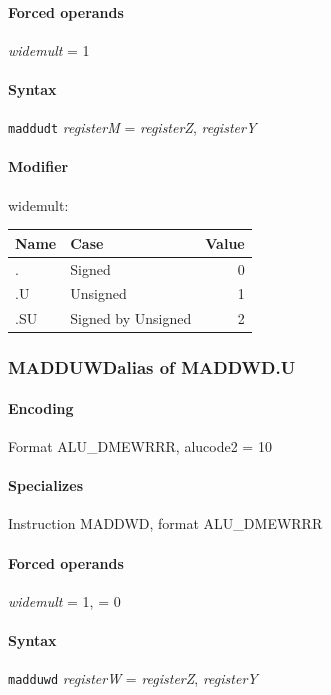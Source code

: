 {\paragraph{Forced operands} \emph{widemult} = 1

\paragraph{Syntax} \texttt{maddudt} \emph{registerM} = \emph{registerZ}, \emph{registerY}

\paragraph{Modifier} \textsf{widemult}:\\

\noindent \begin{tabular}{|l|l|r|} \hline
\bf{Name} & \bf{Case} & \bf{Value} \\ \hline
. & Signed & 0 \\
.U & Unsigned & 1 \\
.SU & Signed by Unsigned & 2 \\
\hline \end{tabular}
\newpage
\subsubsection[{\small MADDUWD: alias of MADDWD.U}]{MADDUWD\hfill alias of MADDWD.U}
\label{instr:MADDUWD}

\paragraph{Encoding} Format \textsf{ALU\_DMEWRRR, alucode2 = 10}\\



\paragraph{Specializes} Instruction MADDWD, format ALU\_DMEWRRR

\paragraph{Forced operands} \emph{widemult} = 1, \emph{} = 0

\paragraph{Syntax} \texttt{madduwd} \emph{registerW} = \emph{registerZ}, \emph{registerY}

}
